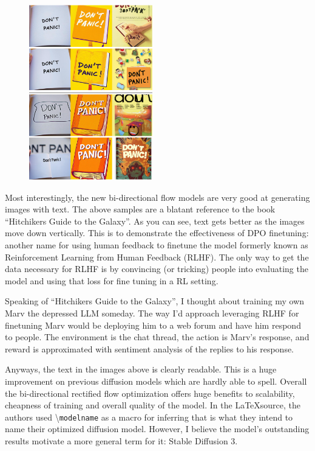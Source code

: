 \documentclass{genai}
\begin{document}
\begin{figure}[h]
	\centering
	\includegraphics[height=3in]{sd3_examples.png}
\end{figure}

Most interestingly, the new bi-directional flow models are very good at generating images with text.
The above samples are a blatant reference to the book “Hitchikers Guide to the Galaxy''.
As you can see, text gets better as the images move down vertically.
This is to demonstrate the effectiveness of DPO finetuning: another name for using human feedback to finetune the model formerly known as Reinforcement Learning from Human Feedback (RLHF).
The only way to get the data necessary for RLHF is by convincing (or tricking) people into evaluating the model and using that loss for fine tuning in a RL setting. 

Speaking of “Hitchikers Guide to the Galaxy'', I thought about training my own Marv the depressed LLM someday.
The way I'd approach leveraging RLHF for finetuning Marv would be deploying him to a web forum and have him respond to people.
The environment is the chat thread, the action is Marv’s response, and reward is approximated with sentiment analysis of the replies to his response.

Anyways, the text in the images above is clearly readable.
This is a huge improvement on previous diffusion models which are hardly able to spell.
Overall the bi-directional rectified flow optimization offers huge benefits to scalability, cheapness of training and overall quality of the model.
In the \LaTeX \space source, the authors used \textbackslash\texttt{modelname} as a macro for \modelname inferring that is what they intend to name their optimized diffusion model.
However, I believe the model's outstanding results motivate a more general term for it: Stable Diffusion 3.
\end{document}
